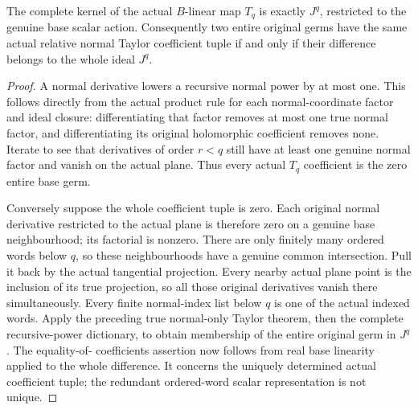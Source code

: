 \begin{theorem}
\label{hir:relative-normal-actual-whole-power-kernel}
\leanok
The complete kernel of the actual $B$-linear map $T_q$ is exactly $J^q$,
restricted to the genuine base scalar action. Consequently two entire
original germs have the same actual relative normal Taylor coefficient tuple
if and only if their difference belongs to the whole ideal $J^q$.
\end{theorem}
\begin{proof}
A normal derivative lowers a recursive normal power by at most one. This
follows directly from the actual product rule for each normal-coordinate
factor and ideal closure: differentiating that factor removes at most one
true normal factor, and differentiating its original holomorphic coefficient
removes none. Iterate to see that derivatives of order $r<q$ still have at
least one genuine normal factor and vanish on the actual plane. Thus every
actual $T_q$ coefficient is the zero entire base germ.

Conversely suppose the whole coefficient tuple is zero. Each original normal
derivative restricted to the actual plane is therefore zero on a genuine
base neighbourhood; its factorial is nonzero. There are only finitely many
ordered words below $q$, so these neighbourhoods have a genuine common
intersection. Pull it back by the actual tangential projection. Every nearby
actual plane point is the inclusion of its true projection, so all those
original derivatives vanish there simultaneously. Every finite normal-index
list below $q$ is one of the actual indexed words. Apply the preceding true
normal-only Taylor theorem, then the complete recursive-power dictionary,
to obtain membership of the entire original germ in $J^q$. The equality-of-
coefficients assertion now follows from real base linearity applied to the
whole difference. It concerns the uniquely determined actual coefficient
tuple; the redundant ordered-word scalar representation is not unique.
\end{proof}

